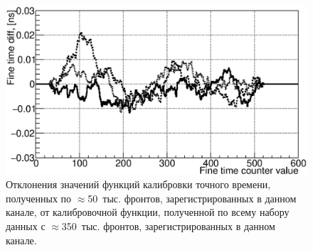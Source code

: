 \begin{figure}[H]
\centering
\includegraphics[width=1.0\textwidth]{pictures/21_calibrationStability_feb2017.eps}
\caption{Отклонения значений функций калибровки точного времени, полученных по $\approx$50~тыс. фронтов, зарегистрированных в данном канале, от калибровочной функции, полученной по всему набору данных с $\approx$350~тыс. фронтов, зарегистрированных в данном канале.}
\label{fig:Stability}
\end{figure}
